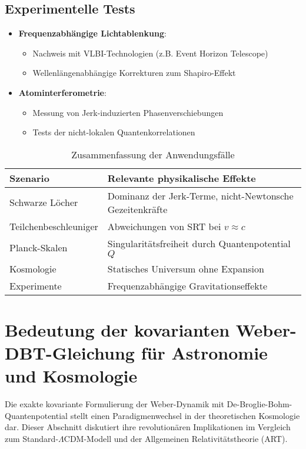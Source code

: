 \subsection{Experimentelle Tests}
\begin{itemize}
    \item \textbf{Frequenzabhängige Lichtablenkung}:
    \begin{itemize}
        \item Nachweis mit VLBI-Technologien (z.B. Event Horizon Telescope)
        \item Wellenlängenabhängige Korrekturen zum Shapiro-Effekt
    \end{itemize}
    
    \item \textbf{Atominterferometrie}:
    \begin{itemize}
        \item Messung von Jerk-induzierten Phasenverschiebungen
        \item Tests der nicht-lokalen Quantenkorrelationen
    \end{itemize}
\end{itemize}

\begin{table}[h]
\centering
\caption{Zusammenfassung der Anwendungsfälle}
\label{tab:applications}
\begin{tabular}{lp{8cm}}
\toprule
\textbf{Szenario} & \textbf{Relevante physikalische Effekte} \\
\midrule
Schwarze Löcher & Dominanz der Jerk-Terme, nicht-Newtonsche Gezeitenkräfte \\
Teilchenbeschleuniger & Abweichungen von SRT bei $v \approx c$ \\
Planck-Skalen & Singularitätsfreiheit durch Quantenpotential $Q$ \\
Kosmologie & Statisches Universum ohne Expansion \\
Experimente & Frequenzabhängige Gravitationseffekte \\
\bottomrule
\end{tabular}
\end{table}

\section{Bedeutung der kovarianten Weber-DBT-Gleichung für Astronomie und Kosmologie}
\label{sec:cosmological_implications}

Die exakte kovariante Formulierung der Weber-Dynamik mit De-Broglie-Bohm-Quantenpotential stellt einen Paradigmenwechsel in der theoretischen Kosmologie dar. Dieser Abschnitt diskutiert ihre revolutionären Implikationen im Vergleich zum Standard-$\Lambda$CDM-Modell und der Allgemeinen Relativitätstheorie (ART).

